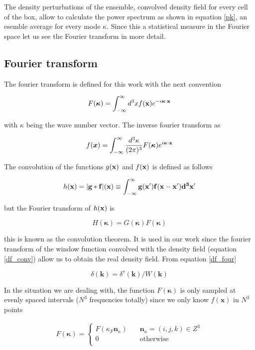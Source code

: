 The density perturbations of the ensemble, convolved density field for every cell 
of the box, allow to calculate the power spectrum as shown in equation \ref{pk},
an esemble average for every mode $\kappa$. Since this a statistical measure in
the Fourier space let us see the Fourier transform in more detail.

\subsection{Fourier transform}

The fourier transform is defined for this work with the next convention

\begin{equation}
F(\boldsymbol{\kappa}) = \int_{-\infty}^{\infty} d^3 x f(\textbf{x})e^{-i \boldsymbol{\kappa}\cdot\bf{x}	}
\label{FT}
\end{equation}

with $\kappa$ being the wave number vector. The inverse fourier transform as

\begin{equation}
f( \boldsymbol{x}) = \int_{-\infty}^{\infty} \frac{d^3 \kappa}{(2\pi)^3}  F(\boldsymbol{\kappa})e^{i \boldsymbol{\kappa}\cdot\bf{x}	}
\label{IFT}
\end{equation}

The convolution of the functions $g(\bf{x})$ and $f(\bf{x})$ is defined as follows

\[h(\bf{x}) = |g*f|(\bf{x})\equiv \int_{-\infty}^{\infty} g(\bf{x}')f(\bf{x} - \bf{x}') d^3 x' \]

but the Fourier transform of $h(\bf{x})$ is 

\[H(\boldsymbol{\kappa}) = G(\boldsymbol{\kappa}) F(\boldsymbol{\kappa})  \]

this is known as the convolution theorem. It is used in our work since the fourier 
transform of the window function convolved with the density field (equation \ref{df_conv})
allow us to obtain the real density field. From equation \ref{df_four} 

\[\delta(\textbf{k}) = \delta^s(\textbf{k})/W(\textbf{k})\]

In the situation we are dealing with, the function $F(\boldsymbol{\kappa})$ is only
sampled at evenly spaced intervals ($N^3$ frequencies totally) since we only 
know $f(\textbf{x})$ in $N^3$ points

\begin{eqnarray*}
F(\boldsymbol{\kappa}) =\left\{ \begin{array}{cl}
F(\kappa_F\boldsymbol{n}_\kappa) \hspace{1em} & \boldsymbol{n}_\kappa = (i,j,k) \in Z^3\\
0 \hspace{1em} & \mathrm{otherwise}\\
\end{array}\right.
\end{eqnarray*} 

